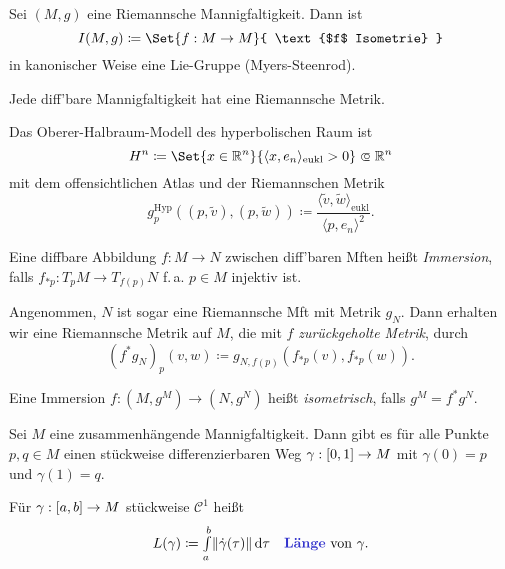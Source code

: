 \documentclass{cheat-sheet}
\newcommand{\abinterval}{\cinterval{a}{b}} %
\begin{document}
\begin{defn}
  Sei $(M, g)$ eine Riemannsche Mannigfaltigkeit. Dann ist
  \[ I(M, g) \coloneqq \Set{ f : M \to M }{ \text{$f$ Isometrie} } \]
  in kanonischer Weise eine Lie-Gruppe (Myers-Steenrod).
\end{defn}

\begin{satz}
  Jede diff'bare Mannigfaltigkeit hat eine Riemannsche Metrik.
\end{satz}

\begin{bsp}
  Das Oberer-Halbraum-Modell des hyperbolischen Raum ist
  \[ H^n \coloneqq \Set{x \in \R^n}{\langle x, e_n \rangle_{\text{eukl}} > 0} \opn \R^n \]
  mit dem offensichtlichen Atlas und der Riemannschen Metrik
  \[ g_p^{\text{Hyp}} ((p, \tilde{v}), (p, \tilde{w})) \coloneqq \frac{\langle \tilde{v}, \tilde{w} \rangle_{\text{eukl}}}{\langle p, e_n \rangle^2}. \]
\end{bsp}

\begin{defn}
  Eine diffbare Abbildung $f : M \to N$ zwischen diff'baren Mften heißt \emph{Immersion}, falls $f_{*p} : T_p M \to T_{f(p)} N$ f.\,a. $p \in M$ injektiv ist.
\end{defn}

\begin{defn}
  Angenommen, $N$ ist sogar eine Riemannsche Mft mit Metrik $g_N$. Dann erhalten wir eine Riemannsche Metrik auf $M$, die mit $f$ \emph{zurückgeholte Metrik}, durch
  \[ (f^* g_N)_p (v, w) \coloneqq g_{N,f(p)}(f_{*p}(v), f_{*p}(w)). \]
\end{defn}

\begin{defn}
  Eine Immersion $f : (M, g^M) \to (N, g^N)$ heißt \emph{isometrisch}, falls $g^M = f^* g^N$.
\end{defn}

\begin{prop}
  Sei $M$ eine zusammenhängende Mannigfaltigkeit. Dann gibt es für alle Punkte $p, q \in M$ einen stückweise differenzierbaren Weg $\gamma : \left[ 0, 1 \right] \to M$ mit $\gamma(0) = p$ und $\gamma(1) = q$.
\end{prop}

\begin{defn}
  Für $\gamma : \abinterval \to M$ stückweise $\mathcal{C}^1$ heißt
  \[
    L(\gamma) \coloneqq \Int{a}{b}{\norm{\dot{\gamma}(\tau)}}{\tau}
    \quad \text{\emph{Länge} von $\gamma$.}
  \]
\end{defn}
\end{document}
